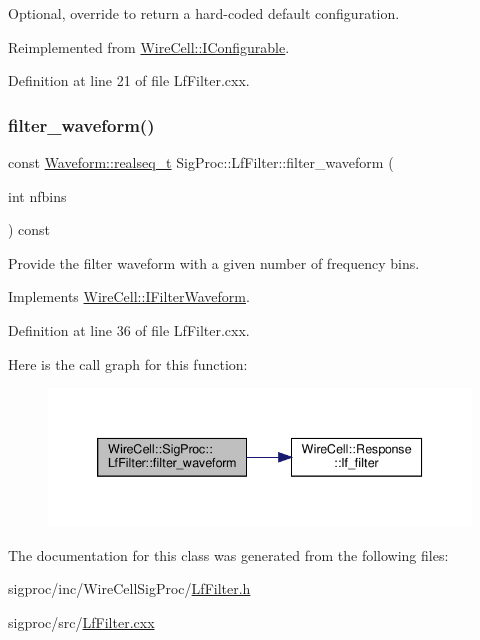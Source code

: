 Optional, override to return a hard-\/coded default configuration. 



Reimplemented from \hyperlink{class_wire_cell_1_1_i_configurable_a54841b2da3d1ea02189478bff96f7998}{Wire\+Cell\+::\+I\+Configurable}.



Definition at line 21 of file Lf\+Filter.\+cxx.

\mbox{\label{class_wire_cell_1_1_sig_proc_1_1_lf_filter_a4b53fff2e1a37331fa8d8a62438c581f}} 
\subsubsection{\texorpdfstring{filter\+\_\+waveform()}{filter\_waveform()}}
{\footnotesize\ttfamily const \hyperlink{namespace_wire_cell_1_1_waveform_a479175e541c8545e87cd8063b74b6956}{Waveform\+::realseq\+\_\+t} Sig\+Proc\+::\+Lf\+Filter\+::filter\+\_\+waveform (\begin{DoxyParamCaption}\item[{int}]{nfbins }\end{DoxyParamCaption}) const\hspace{0.3cm}{\ttfamily [virtual]}}



Provide the filter waveform with a given number of frequency bins. 



Implements \hyperlink{class_wire_cell_1_1_i_filter_waveform_a7757f5772c9974a6c76bebcc856a3069}{Wire\+Cell\+::\+I\+Filter\+Waveform}.



Definition at line 36 of file Lf\+Filter.\+cxx.

Here is the call graph for this function\+:
\nopagebreak
\begin{figure}[H]
\begin{center}
\leavevmode
\includegraphics[width=339pt]{class_wire_cell_1_1_sig_proc_1_1_lf_filter_a4b53fff2e1a37331fa8d8a62438c581f_cgraph}
\end{center}
\end{figure}


The documentation for this class was generated from the following files\+:\begin{DoxyCompactItemize}
\item 
sigproc/inc/\+Wire\+Cell\+Sig\+Proc/\hyperlink{_lf_filter_8h}{Lf\+Filter.\+h}\item 
sigproc/src/\hyperlink{_lf_filter_8cxx}{Lf\+Filter.\+cxx}\end{DoxyCompactItemize}
